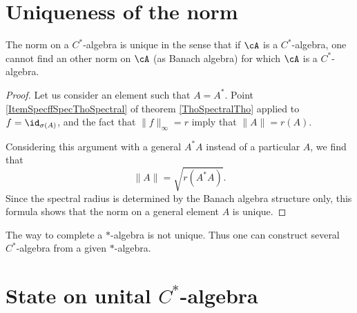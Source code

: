 \section{Uniqueness of the norm}

\begin{proposition}         \label{prop:unicitenormcsa}
The norm on a $C^*$-algebra is unique in the sense that if $\cA$ is a $C^*$-algebra, one cannot find an other norm on $\cA$ (as Banach algebra) for which $\cA$ is a $C^*$-algebra.
\end{proposition}

\begin{proof}
    Let us consider an element such that $A=A^*$. Point \ref{ItemSpecffSpecThoSpectral} of theorem \ref{ThoSpectralTho} applied to $f=\id_{\sigma(A)}$, and the fact that $\| f \|_{\infty}=r$ imply that $\| A \|=r(A)$. 

    Considering this argument with a general $A^*A$ instead of a particular $A$, we find that
    \begin{equation}
    \| A \|=\sqrt{r(A^*A)}.
    \end{equation}
    Since the spectral radius is determined by the Banach algebra structure only, this formula shows that the norm on a general element $A$ is unique.

\end{proof}

\begin{remark}
The way to complete a $*$-algebra is not unique. Thus one can construct several $C^*$-algebra from a given $*$-algebra.
\end{remark}

\section{State on unital $C^*$-algebra}

